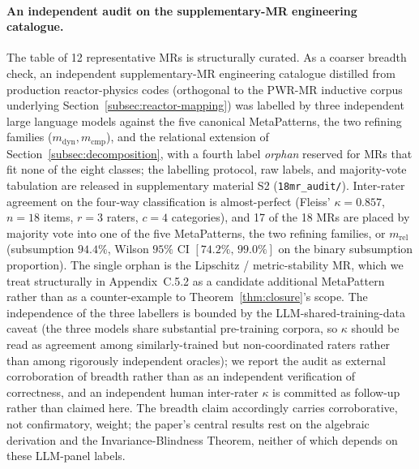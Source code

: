 \documentclass[acmsmall,screen,review]{acmart}
\begin{document}
\paragraph{An independent audit on the supplementary-MR engineering catalogue.} The table of 12 representative MRs is structurally curated. As a coarser breadth check, an independent supplementary-MR engineering catalogue distilled from production reactor-physics codes (orthogonal to the PWR-MR inductive corpus underlying Section~\ref{subsec:reactor-mapping}) was labelled by three independent large language models against the five canonical MetaPatterns, the two refining families ($m_{\mathrm{dyn}}, m_{\mathrm{cmp}}$), and the relational extension of Section~\ref{subsec:decomposition}, with a fourth label \emph{orphan} reserved for MRs that fit none of the eight classes; the labelling protocol, raw labels, and majority-vote tabulation are released in supplementary material S2 (\texttt{18mr\_audit/}). Inter-rater agreement on the four-way classification is almost-perfect (Fleiss' $\kappa = 0.857$, $n=18$ items, $r=3$ raters, $c=4$ categories), and 17 of the 18 MRs are placed by majority vote into one of the five MetaPatterns, the two refining families, or $m_{\mathrm{rel}}$ (subsumption $94.4\%$, Wilson $95\%$ CI $[74.2\%,\, 99.0\%]$ on the binary subsumption proportion). The single orphan is the Lipschitz / metric-stability MR, which we treat structurally in Appendix~C.5.2 as a candidate additional MetaPattern rather than as a counter-example to Theorem~\ref{thm:closure}'s scope. The independence of the three labellers is bounded by the LLM-shared-training-data caveat (the three models share substantial pre-training corpora, so $\kappa$ should be read as agreement among similarly-trained but non-coordinated raters rather than among rigorously independent oracles); we report the audit as external corroboration of breadth rather than as an independent verification of correctness, and an independent human inter-rater $\kappa$ is committed as follow-up rather than claimed here. The breadth claim accordingly carries corroborative, not confirmatory, weight; the paper's central results rest on the algebraic derivation and the Invariance-Blindness Theorem, neither of which depends on these LLM-panel labels.
\end{document}
